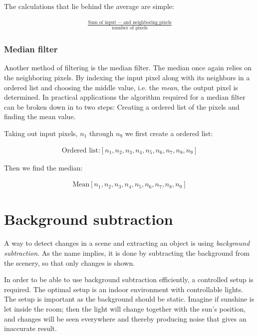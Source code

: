{The calculations that lie behind the average are simple:

\begin{equation}
	\begin{aligned}{
	\frac{\text{Sum of input $-$ and neighboring pixels}}{\text{number of pixels}}
	\label{Mean filter}	}
	\end{aligned}
\end{equation}

\subsubsection{Median filter}
Another method of filtering is the median filter. The median once again relies on the neighboring pixels. By indexing the input pixel along with its neighbors in a ordered list and choosing the middle value, i.e. the \textit{mean}, the output pixel is determined. In practical applications the algorithm required for a median filter can be broken down in to two steps: Creating a ordered list of the pixels and finding the mean value.

Taking out input pixels, $n_1$ through $n_9$ we first create a ordered list:


\begin{equation}
\begin{aligned}{
\text{Ordered list:}[n_1,n_2,n_3,n_4,n_5,n_6,n_7,n_8,n_9]
	\label{Order list of pixels.}}	
	\end{aligned}
\end{equation}

Then we find the median:

\begin{equation}
\begin{aligned}{
\text{Mean} [n_1,n_2,n_3,n_4,\textbf{$n_5$},n_6,n_7,n_8,n_9]
	\label{Finding the mean pixel.}}
	\end{aligned}
\end{equation}

\section{Background subtraction}
A way to detect changes in a scene and extracting an object is using \textit{background subtraction}. As the name implies, it is done by subtracting the background from the scenery, so that only changes is shown.

In order to be able to use background subtraction efficiently, a controlled setup is required. The optimal setup is an indoor environment with controllable lights. The setup is important as the background should be static. Imagine if sunshine is let inside the room; then the light will change together with the sun's position, and changes will be seen everywhere and thereby producing noise that gives an inaccurate result.

}
